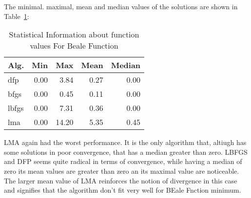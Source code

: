 The minimal. maximal, mean and median values of the solutions are shown in Table~\ref{function_values:beale}:

\begin{table}[H]
\centering
\caption{Statistical Information about function values For Beale Function}
\label{function_values:beale}
\begin{tabular}{lrrrr}
\toprule
 Alg. &  Min &   Max &  Mean &  Median \\
\midrule
  dfp & 0.00 &  3.84 &  0.27 &    0.00 \\
 bfgs & 0.00 &  0.45 &  0.11 &    0.00 \\
lbfgs & 0.00 &  7.31 &  0.36 &    0.00 \\
  lma & 0.00 & 14.20 &  5.35 &    0.45 \\
\bottomrule
\end{tabular}
\end{table}

LMA again had the worst performance. It is the only algorithm that, altiugh has some solutions in
poor convergence, that has a median greater than zero. LBFGS and DFP seems quite radical in terms
of convergence, while having a median of zero its mean values are greater than zero an its maximal
value are noticeable. The larger mean value of LMA reinforces the notion of divergence in this case
and signifies that the algorithm don't fit very well for BEale Fnction minimum.


